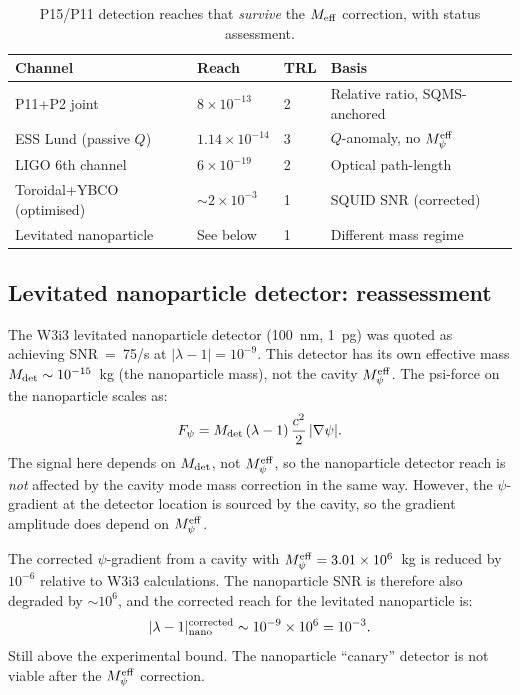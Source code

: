 \documentclass[11pt]{article}
\newcommand{\ee}[1]{\times 10^{#1}}
\newcommand{\Meff}{M_\psi^{\rm eff}}
\newcommand{\lam}{\lambda}
\begin{document}
\begin{table}[H]
\centering
\caption{P15/P11 detection reaches that \emph{survive} the $M_{\rm eff}$
correction, with status assessment.}
\label{tab:P15-surviving}
\begin{tabular}{llll}
\toprule
\textbf{Channel} & \textbf{Reach} & \textbf{TRL} & \textbf{Basis} \\
\midrule
P11+P2 joint & $8\ee{-13}$ & 2 & Relative ratio, SQMS-anchored \\
ESS Lund (passive $Q$) & $1.14\ee{-14}$ & 3 & $Q$-anomaly, no $\Meff$ \\
LIGO 6th channel & $6\ee{-19}$ & 2 & Optical path-length \\
Toroidal+YBCO (optimised) & $\sim 2\ee{-3}$ & 1 & SQUID SNR (corrected) \\
Levitated nanoparticle & See below & 1 & Different mass regime \\
\bottomrule
\end{tabular}
\end{table}

\subsection{Levitated nanoparticle detector: reassessment}

The W3i3 levitated nanoparticle detector (100~nm, 1~pg) was quoted as
achieving SNR~=~75/s at $|\lam-1| = 10^{-9}$. This detector has its own
effective mass $M_{\rm det} \sim 10^{-15}$~kg (the nanoparticle mass), not
the cavity $\Meff$. The psi-force on the nanoparticle scales as:
\begin{equation}
F_\psi = M_{\rm det}\,(\lam-1)\,\frac{c^2}{2}\,|\nabla\psi|.
\end{equation}
The signal here depends on $M_{\rm det}$, not $\Meff$, so the nanoparticle
detector reach is \emph{not} affected by the cavity mode mass correction
in the same way. However, the $\psi$-gradient at the detector location
is sourced by the cavity, so the gradient amplitude does depend on $\Meff$.

The corrected $\psi$-gradient from a cavity with $\Meff = 3.01\ee{6}$~kg
is reduced by $10^{-6}$ relative to W3i3 calculations. The nanoparticle
SNR is therefore also degraded by $\sim 10^{6}$, and the corrected reach
for the levitated nanoparticle is:
\begin{equation}
|\lam-1|_{\rm nano}^{\rm corrected} \sim 10^{-9}\times10^{6} = 10^{-3}.
\end{equation}
Still above the experimental bound. The nanoparticle ``canary'' detector
is not viable after the $\Meff$ correction.
\end{document}
